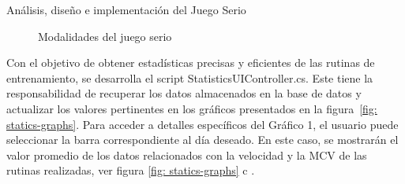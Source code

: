 \begin{thesischapter}{2} {Análisis, diseño e implementación del Juego Serio}
\begin{figure}[ht]
    \centering

    \caption{Modalidades del juego serio}
    \label{fig: game-world}
\end{figure}
     
Con el objetivo de obtener estadísticas precisas y eficientes de las rutinas de entrenamiento, se desarrolla el script StatisticsUIController.cs. 
Este tiene la responsabilidad de recuperar los datos almacenados en la base de datos y actualizar los valores pertinentes en 
los gráficos presentados en la figura~\ref{fig: statics-graphs}. Para acceder a detalles específicos del Gráfico 1, el usuario puede 
seleccionar la barra correspondiente al día deseado. En este caso, se mostrarán el valor promedio %
de los datos relacionados con la velocidad y la MCV de las rutinas realizadas, ver figura \ref{fig: statics-graphs} c  .


\end{thesischapter}
